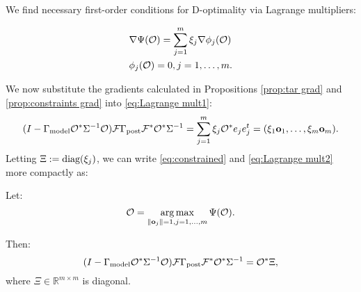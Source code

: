 



We find necessary first-order conditions for D-optimality via Lagrange
multipliers:

\begin{align}
  &\nabla \tar(\obs) = \sum_{j=1}^m \xi_j \nabla \phi_j (\obs)
  \label{eq:Lagrange mult1} \\
    &\phi_j(\obs) = 0, j = 1,\dots,m. \label{eq:Lagrange mult2}
\end{align}

We now substitute the gradients calculated in Propositions
\ref{prop:tar grad} and \ref{prop:constraints grad} into
\eqref{eq:Lagrange mult1}:
\begin{equation}\label{eq:constrained}
  (I - \modcov \obs^* \Sigma^{-1} \obs) \fwd \postcov \fwd^* \obs^*\Sigma^{-1}
  = \sum_{j=1}^m \xi_j \obs^* e_je_j^t = (\xi_1 \meas_1,\dots,\xi_m \meas_m).
\end{equation} 
Letting $\Xi := \textup{diag}(\xi_j)$, we can write \eqref{eq:constrained} and
\eqref{eq:Lagrange mult2} more compactly as:

\begin{theorem}\label{thm:constrained}
  Let:
  \begin{equation*}
    \obs = \argmax_{\|\meas_j\| = 1, j=1,\dots,m}\tar(\obs).
  \end{equation*}
  
  Then:
  \begin{equation*}
    ( I - \modcov \obs^* \Sigma^{-1} \obs) \fwd \postcov \fwd^* \obs^*  \Sigma^{-1}
    = \obs^* \Xi, 
  \end{equation*}
  where $\Xi \in \mathbb{R}^{m \times m}$ is diagonal.
\end{theorem}




